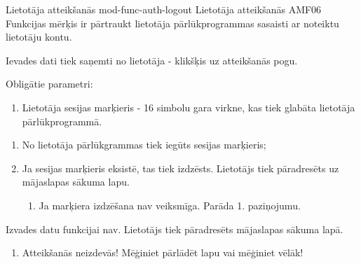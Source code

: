 \moduleFunctionTable
{Lietotāja atteikšanās}
{mod-func-auth-logout}
{Lietotāja atteikšanās}
{AMF06}
{
	Funkcijas mērķis ir pārtraukt lietotāja pārlūkprogrammas sasaisti ar noteiktu lietotāju kontu.
}
{
	Ievades dati tiek saņemti no lietotāja - klikšķis uz atteikšanās pogu.

	Obligātie parametri:
	\begin{enumerate}
		\item Lietotāja sesijas marķieris - 16 simbolu gara virkne, kas tiek glabāta lietotāja pārlūkprogrammā.
	\end{enumerate}
}
{
	\begin{enumerate}
		\item No lietotāja pārlūkgrammas tiek iegūts sesijas marķieris;
		\item Ja sesijas marķieris eksistē, tas tiek izdzēsts. Lietotājs tiek pāradresēts uz mājaslapas sākuma lapu.
		      \begin{enumerate}
			      \item Ja marķiera izdzēšana nav veiksmīga. Parāda 1. paziņojumu.
		      \end{enumerate}
	\end{enumerate}
}
{
	Izvades datu funkcijai nav. Lietotājs tiek pāradresēts mājaslapas sākuma lapā.
}
{
	\begin{enumerate}
		\item Atteikšanās neizdevās! Mēģiniet pārlādēt lapu vai mēģiniet vēlāk!
	\end{enumerate}
}
